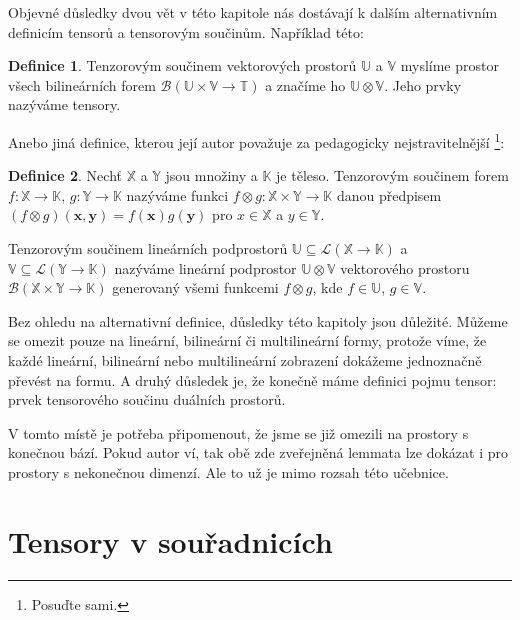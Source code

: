 \documentclass[a5paper,12pt]{amsbook}
\theoremstyle{definition}
\newtheorem{definition}{Definice}[chapter]
\newcommand{\myvec}[1]{\bm{#1}}
\newcommand{\myspace}[1]{\mathbb{#1}}
\begin{document}
\noindent
Objevné důsledky dvou vět v této kapitole nás dostávají k dalším alternativním definicím tensorů
a tensorovým součinům. Například této:

\begin{definition}
Tenzorovým součinem vektorových prostorů $\myspace{U}$ a $\myspace{V}$ myslíme prostor všech
bilineárních forem $\mathcal{B}(\myspace{U}\times\myspace{V}\rightarrow\myspace{T})$ a
značíme ho $\myspace{U}\otimes\myspace{V}$. Jeho prvky nazýváme tensory.
\end{definition}

Anebo jiná definice, kterou její autor považuje za pedagogicky nejstravitelnější
\footnote{Posuďte sami.}:

\begin{definition}
Nechť $\myspace{X}$ a $\myspace{Y}$ jsou množiny a $\myspace{K}$ je těleso. Tenzorovým součinem
forem $f: \myspace{X}\rightarrow\myspace{K}$, $g: \myspace{Y}\rightarrow\myspace{K}$ nazýváme
funkci $f\otimes g: \myspace{X}\times\myspace{Y}\rightarrow\myspace{K}$ danou předpisem
$(f\otimes g)(\myvec{x}, \myvec{y}) = f(\myvec{x})g(\myvec{y})$ pro $x\in \myspace{X}$ a $y\in\myspace{Y}$.

Tenzorovým součinem lineárních podprostorů
$\myspace{U}\subseteq\mathcal{L}(\myspace{X}\rightarrow\myspace{K})$
a $\myspace{V}\subseteq\mathcal{L}(\myspace{Y}\rightarrow\myspace{K})$ nazýváme lineární podprostor 
$\myspace{U}\otimes\myspace{V}$ vektorového prostoru
$\mathcal{B}(\myspace{X}\times\myspace{Y}\rightarrow\myspace{K})$
generovaný všemi funkcemi $f\otimes g$, kde $f\in\myspace{U}$, $g\in\myspace{V}$.
\end{definition}

\noindent
Bez ohledu na alternativní definice, důsledky této kapitoly jsou důležité. Můžeme se omezit pouze
na lineární, bilineární či multilineární formy, protože víme, že každé lineární, bilineární
nebo multilineární zobrazení dokážeme jednoznačně převést na formu. A druhý důsledek je,
že konečně máme definici pojmu tensor: prvek tensorového součinu duálních prostorů.

V tomto místě je potřeba připomenout, že jsme se již omezili na prostory s konečnou bází. Pokud
autor ví, tak obě zde zveřejněná lemmata lze dokázat i pro prostory s nekonečnou dimenzí. Ale to
už je mimo rozsah této učebnice.

\section{Tensory v souřadnicích}
\end{document}
